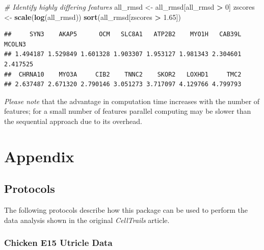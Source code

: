 \documentclass[]{book}
\newenvironment{Shaded}{\begin{snugshade}}{\end{snugshade}}
\newcommand{\KeywordTok}[1]{\textcolor[rgb]{0.13,0.29,0.53}{\textbf{#1}}}
\newcommand{\DecValTok}[1]{\textcolor[rgb]{0.00,0.00,0.81}{#1}}
\newcommand{\FloatTok}[1]{\textcolor[rgb]{0.00,0.00,0.81}{#1}}
\newcommand{\StringTok}[1]{\textcolor[rgb]{0.31,0.60,0.02}{#1}}
\newcommand{\CommentTok}[1]{\textcolor[rgb]{0.56,0.35,0.01}{\textit{#1}}}
\newcommand{\OperatorTok}[1]{\textcolor[rgb]{0.81,0.36,0.00}{\textbf{#1}}}
\newcommand{\NormalTok}[1]{#1}
\theoremstyle{definition}
\theoremstyle{definition}
\theoremstyle{definition}
\theoremstyle{remark}
\begin{document}
\begin{Shaded}
\begin{Highlighting}[]
\CommentTok{# Identify highly differing features}
\NormalTok{all_rmsd <-}\StringTok{ }\NormalTok{all_rmsd[all_rmsd }\OperatorTok{>}\StringTok{ }\DecValTok{0}\NormalTok{]}
\NormalTok{zscores <-}\StringTok{ }\KeywordTok{scale}\NormalTok{(}\KeywordTok{log}\NormalTok{(all_rmsd))}
\KeywordTok{sort}\NormalTok{(all_rmsd[zscores }\OperatorTok{>}\StringTok{ }\FloatTok{1.65}\NormalTok{])}
\end{Highlighting}
\end{Shaded}

\begin{verbatim}
##     SYN3    AKAP5      OCM   SLC8A1   ATP2B2    MYO1H   CAB39L   MCOLN3 
## 1.494187 1.529849 1.601328 1.903307 1.953127 1.981343 2.304601 2.417525 
##  CHRNA10    MYO3A     CIB2    TNNC2    SKOR2   LOXHD1     TMC2 
## 2.637487 2.671320 2.790146 3.051273 3.717097 4.129766 4.799793
\end{verbatim}

\emph{Please note} that the advantage in computation time increases with
the number of features; for a small number of features parallel
computing may be slower than the sequential approach due to its
overhead.

\chapter{Appendix}\label{appendix}

\section{Protocols}\label{protocols}

The following protocols describe how this package can be used to perform
the data analysis shown in the original \emph{CellTrails} article.

\subsection{Chicken E15 Utricle Data}\label{chicken-e15-utricle-data}
\end{document}
